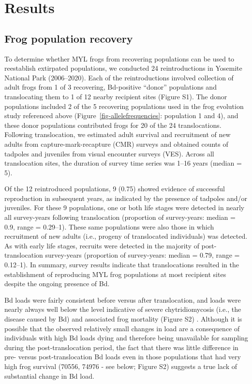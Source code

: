 \documentclass[9pt,twocolumn,twoside,lineno]{pnas-new}
\begin{document}
\section*{Results}

\subsection*{Frog population recovery}

To determine whether MYL frogs from recovering populations can be used
to reestablish extirpated populations, we conducted 24 reintroductions
in Yosemite National Park (2006--2020). Each of the reintroductions
involved collection of adult frogs from 1 of 3 recovering, Bd-positive
``donor'' populations and translocating them to 1 of 12 nearby recipient
sites (Figure S1). The donor populations included 2 of
the 5 recovering populations used in the frog evolution study referenced
above (Figure~\ref{fig-allelefrequencies}: population 1 and 4), and
these donor populations contributed frogs for 20 of the 24
translocations. Following translocation, we estimated adult survival and
recruitment of new adults from capture-mark-recapture (CMR) surveys and
obtained counts of tadpoles and juveniles from visual encounter surveys
(VES). Across all translocation sites, the duration of survey time
series was 1--16 years (median = 5).

Of the 12 reintroduced populations, 9 (0.75) showed evidence of
successful reproduction in subsequent years, as indicated by the
presence of tadpoles and/or juveniles. For these 9 populations, one or
both life stages were detected in nearly all survey-years following
translocation (proportion of survey-years: median = 0.9, range =
0.29--1). These same populations were also those in which recruitment of
new adults (i.e., progeny of translocated individuals) was detected. As
with early life stages, recruits were detected in the majority of
post-translocation survey-years (proportion of survey-years: median =
0.79, range = 0.12--1). In summary, survey results indicate that
translocations resulted in the establishment of reproducing MYL frog
populations at most recipient sites despite the ongoing presence of Bd.

Bd loads were fairly consistent before versus after translocation, and
loads were nearly always well below the level indicative of severe
chytridiomycosis (i.e., the disease caused by Bd) and associated frog
mortality (Figure S2)
\citep{joseph2018, vredenburg2010}. Although it is possible that the
observed relatively small changes in load are a consequence of
individuals with high Bd loads dying and therefore being unavailable for
sampling during the post-translocation period, the fact that there was
little difference in pre- versus post-translocation Bd loads even in
those populations that had very high frog survival (70556, 74976 - see
below; Figure S2) suggests a true lack of
substantial change in Bd load.
\end{document}
